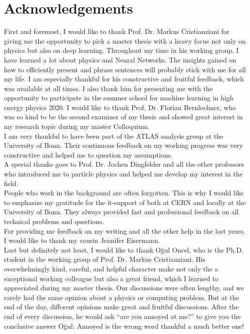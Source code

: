 \chapter*{Acknowledgements}
\label{sec:ack}

First and foremost, I would like to thank Prof. Dr. Markus Cristianziani for giving me the opportunity to pick a master thesis with a heavy focus not only on physics but also on deep learning. Throughout my time in his working group, I have learned a lot about physics and Neural Networks. The insights gained on how to efficiently present and phrase sentences will probably stick with me for all my life. I am especially thankful for his constructive and fruitful feedback, which was available at all times. I also thank him for presenting me with the opportunity to participate in the summer school for machine learning in high energy physics 2020.
I would like to thank Prof. Dr. Florian Bernlochner, who was so kind to be the second examiner of my thesis and showed great interest in my research topic during my master Colloquium. \\
I am very thankful to have been part of the ATLAS analysis group at the University of Bonn. Their continuous feedback on my working progress was very constructive and helped me to question my assumptions. \\
A special thanks goes to Prof. Dr. Jochen Dingfelder and all the other professors who introduced me to particle physics and helped me develop my interest in the field. \\
People who work in the background are often forgotten. This is why I would like to emphasize my gratitude for the it-support of both at CERN and locally at the University of Bonn. They always provided fast and professional feedback on all technical problems and questions. \\
For providing me feedback on my writing and all the other help in the last years, I would like to thank my cousin Jennifer Eisermann. \\
Last but definitely not least, I would like to thank O\u{g}ul Oncel, who is the Ph.D. student in the working group of Prof. Dr. Markus Cristianziani. His overwhelmingly kind, careful, and helpful character make not only the a exceptional working colleague but also a great friend, which I learned to appreciated during my master thesis. Our discussions were often lengthy, and we rarely had the same opinion about a physics or computing problem. But at the end of the day, different opinions make great and fruitful discussions. After the end of every discussion, he would ask ``are you annoyed at me?'' to give you the conclusive answer O\u{g}ul: Annoyed is the wrong word thankful a much better one!
